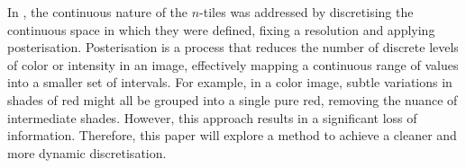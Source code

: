 \bigskip
\noindent In \cite{thesis}, the continuous nature of the $n$-tiles was addressed by discretising the continuous space in which they were defined, fixing a resolution and applying posterisation. Posterisation is a process that reduces the number of discrete levels of color or intensity in an image, effectively mapping a continuous range of values into a smaller set of intervals. For example, in a color image, subtle variations in shades of red might all be grouped into a single pure red, removing the nuance of intermediate shades. However, this approach results in a significant loss of information. Therefore, this paper will explore a method to achieve a cleaner and more dynamic discretisation.
